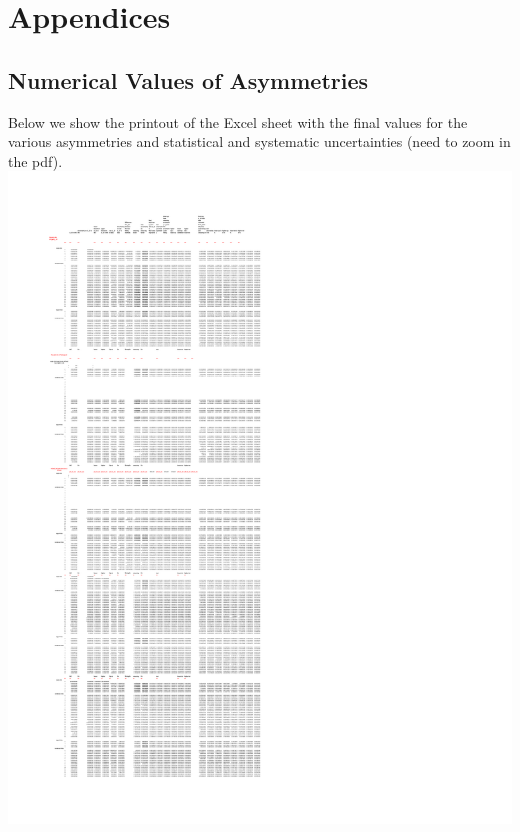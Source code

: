 \documentclass[english,notitlepage,12pt,a4paper]{article}
\begin{document}
\section*{Appendices}
\renewcommand{\thesubsection}{\Alph{subsection}}



\subsection{Numerical Values of Asymmetries}\label{sec:spreadsheet}
Below we show the printout of the Excel sheet with the final values for the various asymmetries and statistical and systematic uncertainties (need to zoom in the pdf).
\includegraphics[width=1.06\textwidth]{FinalResult_2017_BugfixedJuly3_2017_Relabelled2_Page.pdf}




%



%


\end{document}
